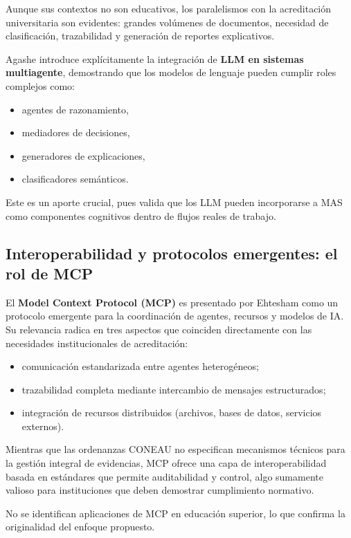\documentclass[12pt]{article}
\let\cite\citep
\begin{document}
Aunque sus contextos no son educativos, los paralelismos con la acreditación universitaria son evidentes: grandes volúmenes de documentos, necesidad de clasificación, trazabilidad y generación de reportes explicativos.

Agashe \cite{agashe2023llm} introduce explícitamente la integración de \textbf{LLM en sistemas multiagente}, demostrando que los modelos de lenguaje pueden cumplir roles complejos como:

\begin{itemize}
    \item agentes de razonamiento,
    \item mediadores de decisiones,
    \item generadores de explicaciones,
    \item clasificadores semánticos.
\end{itemize}

Este es un aporte crucial, pues valida que los LLM pueden incorporarse a MAS como componentes cognitivos dentro de flujos reales de trabajo.

\subsection{Interoperabilidad y protocolos emergentes: el rol de MCP}

El \textbf{Model Context Protocol (MCP)} es presentado por Ehtesham \cite{ehtesham2025survey} como un protocolo emergente para la coordinación de agentes, recursos y modelos de IA.  
Su relevancia radica en tres aspectos que coinciden directamente con las necesidades institucionales de acreditación:

\begin{itemize}
    \item comunicación estandarizada entre agentes heterogéneos;
    \item trazabilidad completa mediante intercambio de mensajes estructurados;
    \item integración de recursos distribuidos (archivos, bases de datos, servicios externos).
\end{itemize}

Mientras que las ordenanzas CONEAU no especifican mecanismos técnicos para la gestión integral de evidencias, MCP ofrece una capa de interoperabilidad basada en estándares que permite auditabilidad y control, algo sumamente valioso para instituciones que deben demostrar cumplimiento normativo.

No se identifican aplicaciones de MCP en educación superior, lo que confirma la originalidad del enfoque propuesto.
\end{document}

